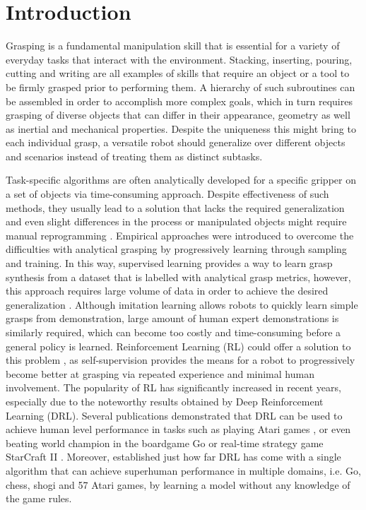 \chapter{Introduction}

Grasping is a fundamental manipulation skill that is essential for a variety of everyday tasks that interact with the environment. Stacking, inserting, pouring, cutting and writing are all examples of skills that require an object or a tool to be firmly grasped prior to performing them. A hierarchy of such subroutines can be assembled in order to accomplish more complex goals, which in turn requires grasping of diverse objects that can differ in their appearance, geometry as well as inertial and mechanical properties. Despite the uniqueness this might bring to each individual grasp, a versatile robot should generalize over different objects and scenarios instead of treating them as distinct subtasks.

Task-specific algorithms are often analytically developed for a specific gripper on a set of objects via time-consuming approach. Despite effectiveness of such methods, they usually lead to a solution that lacks the required generalization and even slight differences in the process or manipulated objects might require manual reprogramming \cite{sahbani_overview_2012}.
Empirical approaches were introduced to overcome the difficulties with analytical grasping by progressively learning through sampling and training. In this way, supervised learning provides a way to learn grasp synthesis from a dataset that is labelled with analytical grasp metrics, however, this approach requires large volume of data in order to achieve the desired generalization \cite{mahler_dex-net_2017}. Although imitation learning allows robots to quickly learn simple grasps from demonstration, large amount of human expert demonstrations is similarly required, which can become too costly and time-consuming before a general policy is learned. Reinforcement Learning (RL) could offer a solution to this problem \cite{sutton_reinforcement_2018}, as self-supervision provides the means for a robot to progressively become better at grasping via repeated experience and minimal human involvement. The popularity of RL has significantly increased in recent years, especially due to the noteworthy results obtained by Deep Reinforcement Learning (DRL). Several publications demonstrated that DRL can be used to achieve human level performance in tasks such as playing Atari games \cite{mnih_human-level_2015}, or even beating world champion in the boardgame Go \cite{silver_mastering_2017} or real-time strategy game StarCraft II \cite{vinyals_grandmaster_2019}. Moreover, \citet{schrittwieser_mastering_2020} established just how far DRL has come with a single algorithm that can achieve superhuman performance in multiple domains, i.e. Go, chess, shogi and 57 Atari games, by learning a model without any knowledge of the game rules.

